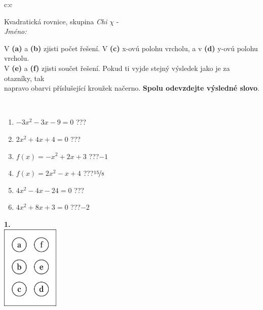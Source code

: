 \documentclass[10pt]{report}
\begin{document}
\begin{tabular}{c:c}
\begin{minipage}[c][104.5mm][t]{0.5\linewidth}
\begin{center}
\vspace{7mm}
{\huge Kvadratická rovnice, skupina \textit{Chi $\chi$} -}\\[5mm]
\textit{Jméno:}\phantom{xxxxxxxxxxxxxxxxxxxxxxxxxxxxxxxxxxxxxxxxxxxxxxxxxxxxxxxxxxxxxxxxx}\\[5mm]
\begin{minipage}{0.95\linewidth}
\begin{center}
V \textbf{(a)} a \textbf{(b)} zjisti počet řešení. V \textbf{(c)} x-ovú polohu vrcholu, a v \textbf{(d)} y-ovú polohu vrcholu.\\V \textbf{(e)} a \textbf{(f)} zjisti součet řešení. Pokud ti vyjde stejný výsledek jako je za otazníky, tak\\napravo obarvi příslušející kroužek načerno. \textbf{Spolu odevzdejte výsledné slovo}.
\end{center}
\end{minipage}
\\[1mm]
\begin{minipage}{0.79\linewidth}
\begin{center}
\begin{varwidth}{\linewidth}
\begin{enumerate}
\Large
\item $-3x^2-3x-9=0$\quad \dotfill\; ???\;\dotfill {}
\item $2x^2+4x+4=0$\quad \dotfill\; ???\;\dotfill {}
\item $f(x)=-x^2+2x+3$\quad \dotfill\; ???\;\dotfill \quad $-1$
\item $f(x)=2x^2-x+4$\quad \dotfill\; ???\;\dotfill \quad $\nicefrac{15}{8}$
\item $4x^2-4x-24=0$\quad \dotfill\; ???\;\dotfill {}
\item $4x^2+8x+3=0$\quad \dotfill\; ???\;\dotfill \quad $-2$
\end{enumerate}
\end{varwidth}
\end{center}
\end{minipage}
\begin{minipage}{0.20\linewidth}
\begin{center}
{\Huge\bfseries 1.} \\[2mm]
\includegraphics[height=40mm]{../images/braille.png}

\end{center}
\end{minipage}
\end{center}
\end{minipage}
\end{tabular}
\end{document}
